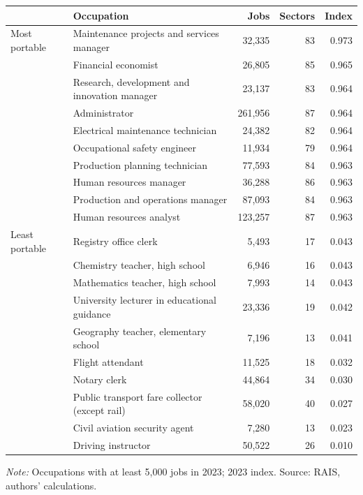 {\footnotesize
\begin{threeparttable}
\begin{tabular}{lp{8.2cm}rrr}
\toprule
 & Occupation & Jobs & Sectors & Index \\
\midrule
Most portable & Maintenance projects and services manager & 32,335 & 83 & 0.973 \\
 & Financial economist & 26,805 & 85 & 0.965 \\
 & Research, development and innovation manager & 23,137 & 83 & 0.964 \\
 & Administrator & 261,956 & 87 & 0.964 \\
 & Electrical maintenance technician & 24,382 & 82 & 0.964 \\
 & Occupational safety engineer & 11,934 & 79 & 0.964 \\
 & Production planning technician & 77,593 & 84 & 0.963 \\
 & Human resources manager & 36,288 & 86 & 0.963 \\
 & Production and operations manager & 87,093 & 84 & 0.963 \\
 & Human resources analyst & 123,257 & 87 & 0.963 \\
\addlinespace[3pt]
Least portable & Registry office clerk & 5,493 & 17 & 0.043 \\
 & Chemistry teacher, high school & 6,946 & 16 & 0.043 \\
 & Mathematics teacher, high school & 7,993 & 14 & 0.043 \\
 & University lecturer in educational guidance & 23,336 & 19 & 0.042 \\
 & Geography teacher, elementary school & 7,196 & 13 & 0.041 \\
 & Flight attendant & 11,525 & 18 & 0.032 \\
 & Notary clerk & 44,864 & 34 & 0.030 \\
 & Public transport fare collector (except rail) & 58,020 & 40 & 0.027 \\
 & Civil aviation security agent & 7,280 & 13 & 0.023 \\
 & Driving instructor & 50,522 & 26 & 0.010 \\
\bottomrule
\end{tabular}
\begin{tablenotes}[flushleft]\footnotesize
\item \textit{Note:} Occupations with at least 5,000 jobs in 2023; 2023 index. Source: RAIS, authors' calculations.
\end{tablenotes}
\end{threeparttable}
}
